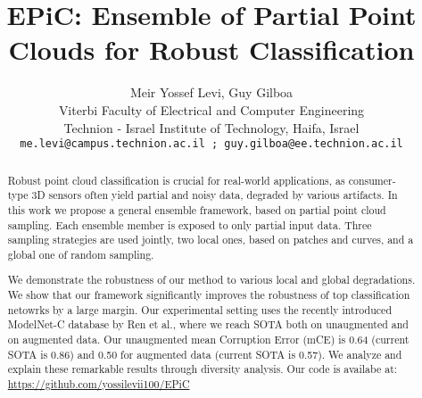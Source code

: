 \documentclass[10pt,twocolumn]{article}
\begin{document}
\title{EPiC: Ensemble of Partial Point Clouds for Robust Classification}

\author{Meir Yossef Levi, Guy Gilboa\\
Viterbi Faculty of Electrical and Computer Engineering \\
Technion - Israel Institute of Technology, Haifa, Israel\\
{\tt\small me.levi@campus.technion.ac.il ; guy.gilboa@ee.technion.ac.il}
}

\maketitle



\begin{abstract}
    Robust point cloud classification is crucial for real-world applications, as consumer-type 3D sensors often yield partial and noisy data, degraded by various artifacts.
In this work we propose a general ensemble framework, based on partial point cloud sampling. Each ensemble member is exposed to only partial input data. 
Three sampling strategies are used jointly, two local ones, based on patches and curves, and a global one of random sampling.
    
    We demonstrate the robustness of our method to various local and global degradations.
    We show that our framework significantly improves the robustness of top classification netowrks by a large margin.
Our experimental setting uses the recently introduced ModelNet-C database by Ren et al.\cite{modelnetc}, where we reach SOTA both on unaugmented and on augmented data. Our unaugmented  mean Corruption Error (mCE) is 0.64 (current SOTA is 0.86) and 0.50 for augmented data 
    (current SOTA is 0.57).
We analyze and explain these remarkable results through diversity analysis. Our code is availabe at: \url{https://github.com/yossilevii100/EPiC}
\end{abstract}
\end{document}
